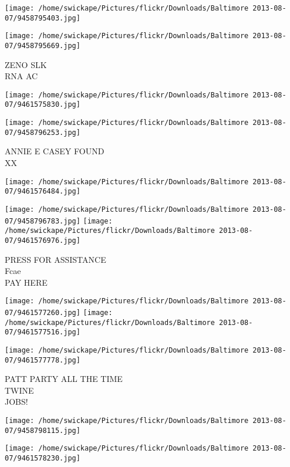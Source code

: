 \documentclass[10pt,letterpaper]{article}
\begin{document}
\texttt{[image: /home/swickape/Pictures/flickr/Downloads/Baltimore 2013-08-07/9458795403.jpg]}

\vspace{0.25in}
\texttt{[image: /home/swickape/Pictures/flickr/Downloads/Baltimore 2013-08-07/9458795669.jpg]}

ZENO SLK\\
RNA AC\\
\pagebreak

\texttt{[image: /home/swickape/Pictures/flickr/Downloads/Baltimore 2013-08-07/9461575830.jpg]}

\vspace{0.25in}
\texttt{[image: /home/swickape/Pictures/flickr/Downloads/Baltimore 2013-08-07/9458796253.jpg]}

ANNIE E CASEY FOUND\\
XX\\
\pagebreak

\texttt{[image: /home/swickape/Pictures/flickr/Downloads/Baltimore 2013-08-07/9461576484.jpg]}

\vspace{0.25in}
\texttt{[image: /home/swickape/Pictures/flickr/Downloads/Baltimore 2013-08-07/9458796783.jpg]}
\texttt{[image: /home/swickape/Pictures/flickr/Downloads/Baltimore 2013-08-07/9461576976.jpg]}

PRESS FOR ASSISTANCE\\
Fcae\\
PAY HERE\\
\pagebreak

\texttt{[image: /home/swickape/Pictures/flickr/Downloads/Baltimore 2013-08-07/9461577260.jpg]}
\texttt{[image: /home/swickape/Pictures/flickr/Downloads/Baltimore 2013-08-07/9461577516.jpg]}

\texttt{[image: /home/swickape/Pictures/flickr/Downloads/Baltimore 2013-08-07/9461577778.jpg]}

PATT PARTY ALL THE TIME\\
TWINE\\
JOBS!\\
\pagebreak

\texttt{[image: /home/swickape/Pictures/flickr/Downloads/Baltimore 2013-08-07/9458798115.jpg]}

\vspace{0.25in}
\texttt{[image: /home/swickape/Pictures/flickr/Downloads/Baltimore 2013-08-07/9461578230.jpg]}
\end{document}
